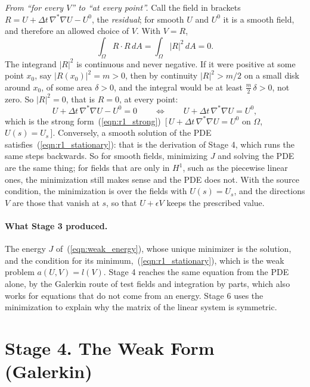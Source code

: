 \emph{From ``for every $V$'' to ``at every point''.} Call the field in brackets $R = U + \Delta t\,\nabla^*\nabla U - U^0$, the \emph{residual}; for smooth $U$ and $U^0$ it is a smooth field, and therefore an allowed choice of $V$. With $V = R$,
\begin{equation*}
\int_\Omega R\cdot R\, dA = \int_\Omega |R|^2\, dA = 0 .
\end{equation*}
The integrand $|R|^2$ is continuous and never negative. If it were positive at some point $x_0$, say $|R(x_0)|^2 = m > 0$, then by continuity $|R|^2 > m/2$ on a small disk around $x_0$, of some area $\delta > 0$, and the integral would be at least $\frac m2\,\delta > 0$, not zero. So $|R|^2 = 0$, that is $R = 0$, at every point:
\begin{equation*}
U + \Delta t\, \nabla^*\nabla U - U^0 = 0 \qquad\Longleftrightarrow\qquad U + \Delta t\, \nabla^*\nabla U = U^0 ,
\end{equation*}
which is the strong form~(\ref{eqn:r1_strong})~[\,$U + \Delta t\,\nabla^*\nabla U = U^0$ on $\Omega$, $U(s) = U_s$\,]. Conversely, a smooth solution of the PDE satisfies~(\ref{eqn:r1_stationary}): that is the derivation of Stage 4, which runs the same steps backwards. So for smooth fields, minimizing $J$ and solving the PDE are the same thing; for fields that are only in $H^1$, such as the piecewise linear ones, the minimization still makes sense and the PDE does not. With the source condition, the minimization is over the fields with $U(s) = U_s$, and the directions $V$ are those that vanish at $s$, so that $U + \epsilon V$ keeps the prescribed value.


\paragraph{What Stage 3 produced.} The energy $J$ of~(\ref{eqn:weak_energy}), whose unique minimizer is the solution, and the condition for its minimum,~(\ref{eqn:r1_stationary}), which is the weak problem $a(U, V) = l(V)$. Stage 4 reaches the same equation from the PDE alone, by the Galerkin route of test fields and integration by parts, which also works for equations that do not come from an energy. Stage 6 uses the minimization to explain why the matrix of the linear system is symmetric.

\section{Stage 4. The Weak Form (Galerkin)}
\label{section:weak}


